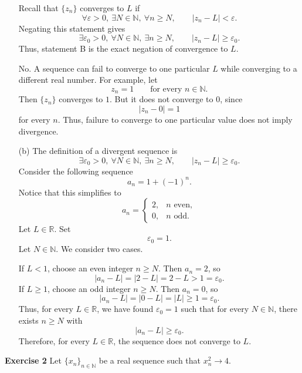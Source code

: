 \documentclass[12pt]{article}
\begin{document}
\begin{enumerate}
          Recall that \(\{z_n\}\) converges to \(L\) if
          \[
              \forall \varepsilon>0,\ \exists N\in\mathbb N,\ \forall n\ge N,
              \qquad |z_n-L|<\varepsilon.
          \]
          Negating this statement gives
          \[
              \exists \varepsilon_0>0,\ \forall N\in\mathbb N,\ \exists n\ge N,
              \qquad |z_n-L|\ge \varepsilon_0.
          \]
          Thus, statement B is the exact negation of convergence to \(L\).

          No. A sequence can fail to converge to one particular \(L\) while converging to a different real number.
          For example, let
          \[
              z_n=1 \qquad \text{for every } n\in\mathbb N.
          \]Then \(\{z_n\}\) converges to \(1\). But it does not converge to \(0\), since
          \[
              |z_n-0|=1
          \]for every \(n\). Thus, failure to converge to one particular value does not imply divergence.
    \item [(b)]
          The definition of a divergent sequence is
          \[
              \exists \varepsilon_0>0,\ \forall N\in\mathbb N,\ \exists n\ge N,
              \qquad |z_n-L|\ge \varepsilon_0.
          \]
          Consider the following sequence
          \[
              a_n = 1 + (-1)^n.
          \]
          Notice that this simplifies to
          \[
              a_n=
              \begin{cases}
                  2, & n \text{ even}, \\
                  0, & n \text{ odd}.
              \end{cases}
          \]
          Let \(L\in\mathbb R\).
          Set
          \[
              \varepsilon_0=1.
          \]
          Let \(N\in\mathbb N\).
          We consider two cases.

          If \(L<1\), choose an even integer \(n\ge N\).
          Then \(a_n=2\), so
          \[
              |a_n-L|=|2-L|=2-L>1=\varepsilon_0.
          \]If \(L\ge1\), choose an odd integer \(n\ge N\). Then \(a_n=0\), so
          \[
              |a_n-L|=|0-L|=|L|\ge1=\varepsilon_0.
          \]Thus, for every \(L\in\mathbb R\), we have found \(\varepsilon_0=1\) such that for every \(N\in\mathbb N\), there exists \(n\ge N\) with
          \[
              |a_n-L|\ge\varepsilon_0.
          \]
          Therefore, for every \(L\in\mathbb R\), the sequence does not converge to \(L\).

\end{enumerate}
\noindent{} \textbf{Exercise 2}
Let $\{x_n\}_{n \in \mathbb{N}}$ be a real sequence such that $x_n^2 \to 4$.
\end{document}
